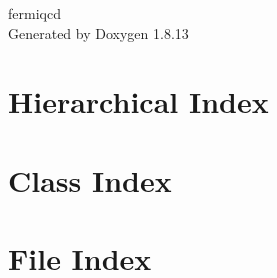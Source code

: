 \documentclass[twoside]{book}
\newcommand{\+}{\discretionary{\mbox{\scriptsize$\hookleftarrow$}}{}{}}
\newcommand{\clearemptydoublepage}{%
  \newpage{\pagestyle{empty}\cleardoublepage}%
}
\begin{document}
\hypersetup{pageanchor=false,
             bookmarksnumbered=true,
             pdfencoding=unicode
            }
\begin{titlepage}
\vspace*{7cm}
\begin{center}%
{\Large fermiqcd }\\
\vspace*{1cm}
{\large Generated by Doxygen 1.8.13}\\
\end{center}
\end{titlepage}
\clearemptydoublepage
{}
\tableofcontents
\clearemptydoublepage
{}
\hypersetup{pageanchor=true}

\chapter{Hierarchical Index}

\chapter{Class Index}

\chapter{File Index}

\end{document}

